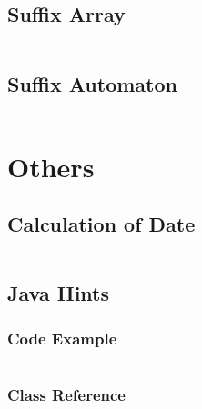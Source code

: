 \documentclass[a4paper,openany]{book}
\newcommand{\cppcode}[1]
{
  \inputminted[mathescape,
  tabsize=4,
  linenos,
  framesep=2mm,
  breakaftergroup=true,
  breakautoindent=true,
  breakbytoken=true,
  breaklines=true,
  fontsize=\small
  ]{cpp}{Source/#1}
}
\newcommand{\javacode}[1]
{
  \inputminted[mathescape,
  tabsize=4,
  linenos,
  framesep=2mm,
  breakaftergroup=true,
  breakautoindent=true,
  breakbytoken=true,
  breaklines=true,
  fontsize=\small
  ]{java}{Source/#1}
}
\begin{document}
\section{Suffix Array}
\cppcode{/String Algorithms/Suffix Array.cpp}
\section{Suffix Automaton}
\cppcode{/String Algorithms/Suffix Automaton.cpp}

\chapter{Others}
\section{Calculation of Date}
\cppcode{/Others/Calculation of Date.cpp}
\section{Java Hints}
\subsection{Code Example}
\javacode{/Others/Java Hints/Code.java}
\subsection{Class Reference}
\end{document}
